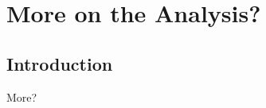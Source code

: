 \setcounter{chapter}{6}
\chapter{More on the Analysis?}\label{ch:analysis2}

\section{Introduction}\label{sec:Intro_analysis}

More?